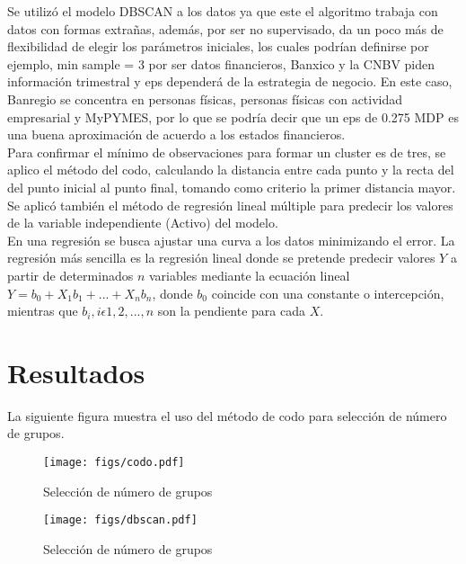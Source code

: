 \documentclass{article}
\begin{document}
Se utilizó el modelo DBSCAN a los datos ya que este el algoritmo trabaja con datos con formas extrañas, además, por ser no supervisado, da un poco más de flexibilidad de elegir los parámetros iniciales, los cuales podrían definirse por ejemplo, min sample = 3 por ser datos financieros, Banxico y la CNBV piden información trimestral y eps dependerá de la estrategia de negocio. En este caso, Banregio se concentra en personas físicas, personas físicas con actividad empresarial y MyPYMES, por lo que se podría decir que un eps de 0.275 MDP es una buena aproximación de acuerdo a los estados financieros.
\\

Para confirmar el mínimo de observaciones para formar un cluster es de tres, se aplico el método del codo, calculando la distancia entre cada punto y la recta del del punto inicial al punto final, tomando como criterio la primer distancia mayor.
\\

Se aplicó también el método de regresión lineal múltiple para predecir los valores de la variable independiente (Activo) del modelo.
\\

En una regresión se busca ajustar una curva a los datos minimizando el error. La regresión más sencilla es la regresión lineal donde se pretende predecir valores $Y$ a partir de determinados $n$ variables mediante la ecuación lineal $Y = b_0 + X_1b_1 + ... + X_nb_n$, donde $b_0$ coincide con una constante o intercepción, mientras que $b_i,i \epsilon {1,2,...,n}$ son la pendiente para cada $X$.


\section{Resultados}

La siguiente figura muestra el uso del método de codo para selección de número de grupos.
\\

\begin{figure}
    \centering
    \texttt{[image: figs/codo.pdf]}
    \caption{Selección de número de grupos}
    \label{fig:Método de codo}
\end{figure}

\begin{figure}
    \centering
    \texttt{[image: figs/dbscan.pdf]}
    \caption{Selección de número de grupos}
    \label{fig:Método de codo}
\end{figure}
\end{document}
